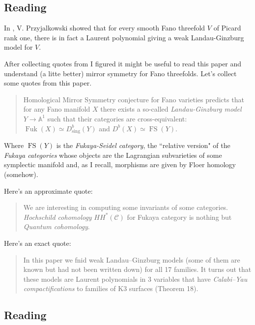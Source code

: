 \subsection{Reading \cite{prz09}}

\begin{upshot}\leavevmode
	In \cite{prz09}, V. Przyjalkowski showed that for every smooth Fano threefold $V$ of Picard rank one, there is in fact a Laurent polynomial giving a weak Landau-Ginzburg model for $V$.
\end{upshot}
\vspace{.5em}

After collecting quotes from \cite{jan4} I figured it might be useful to read this paper and understand (a litte better) mirror symmetry for Fano threefolds. Let's collect some quotes from this paper.

\begin{quotation}
	Homological Mirror Symmetry conjecture for Fano varieties predicts that for any Fano manifold \(X\) there exists a so-called \textit{Landau-Ginzburg model}  \(Y \to \mathbb{A}^1\) such that their categories are cross-equivalent: \(\operatorname{Fuk}(X) \simeq D^b_{\operatorname{sing}}(Y)\) and \(D^b(X)\simeq \operatorname{FS}(Y)\).
\end{quotation}
Where \(\operatorname{FS}(Y)\) is the \textit{Fukaya-Seidel category}, the ``relative version" of the \textit{Fukaya categories} whose objects are the Lagrangian subvarieties of some symplectic manifold and, {\color{6}as I recall}, morphisms are given by Floer homology (somehow).

Here's an approximate quote:
\begin{quotation}
We are interesting in computing some invariants of some categories. \textit{Hochschild cohomology} \(HH^{*}(\mathcal{C})\) for Fukaya category is nothing but \textit{Quantum cohomology}.
\end{quotation}
Here's an exact quote:
\begin{quotation}
	In this paper we fnid weak Landau–Ginzburg models (some of them are known but had not been written down) for all 17 families. It turns out that these models are Laurent polynomials in 3 variables that have \textit{Calabi–Yau compactifications} to families of K3 surfaces (Theorem 18). 
\end{quotation}

\subsection{Reading \cite{ilp13}}

